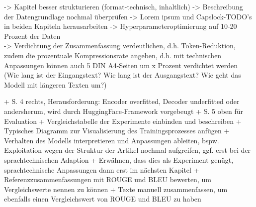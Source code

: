 \noindent
-> Kapitel besser strukturieren (format-technisch, inhaltlich)
-> Beschreibung der Datengrundlage nochmal überprüfen
-> Lorem ipsum und Capslock-TODO's in beiden Kapiteln herausarbeiten 
-> Hyperparameteroptimierung auf 10-20 Prozent der Daten\\
-> Verdichtung der Zusammenfassung verdeutlichen, d.h. Token-Reduktion, zudem die prozentuale Kompressionsrate angeben, d.h. mit technischen Anpassungen können auch 5 DIN A4-Seiten um x Prozent verdichtet werden (Wie lang ist der Eingangstext? Wie lang ist der Ausgangstext?
Wie geht das Modell mit längeren Texten um?)

\noindent
+ \cite{YAN19} S. 4 rechts, Herausforderung: Encoder overfitted, Decoder underfitted oder andersherum, wird durch HuggingFace-Framework vorgebeugt
+ \cite{YAN19} S. 5 oben für Evaluation
+ Vergleichstabelle der Experimente einbinden und beschreiben
+ Typisches Diagramm zur Visualisierung des Trainingsprozesses anfügen
+ Verhalten des Modells interpretieren und Anpassungen ableiten, bspw. Exploitation wegen der Struktur der Artikel nochmal aufgreifen, ggf. erst bei der sprachtechnischen Adaption
+ Erwähnen, dass dies als Experiment genügt, sprachtechnische Anpassungen dann erst im nächsten Kapitel
+ Referenzzusammenfassungen mit ROUGE und BLEU bewerten, um Vergleichswerte nennen zu können
+ Texte manuell zusammenfassen, um ebenfalls einen Vergleichswert von ROUGE und BLEU zu haben\\
